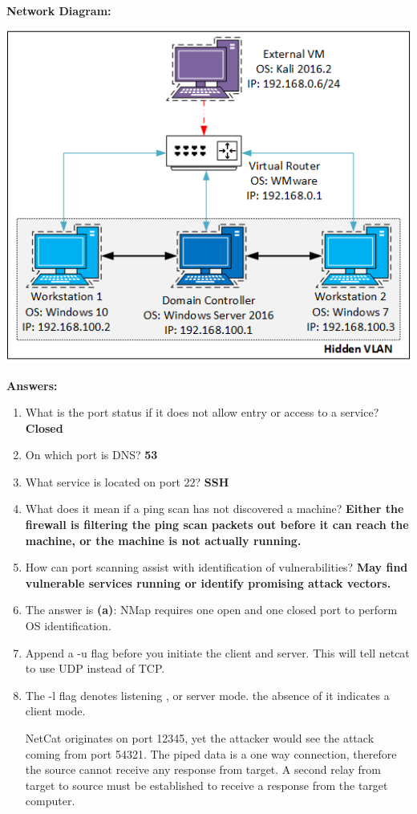 \documentclass[12pt]{article}
\begin{document}
\textbf{Network Diagram:}

\begin{center}
	\includegraphics{NetworkDiagram.png}
\end{center}


\newpage
\noindent
\textbf{Answers:}
\begin{enumerate}
\item What is the port status if it does not allow entry or access to a service? \textbf{Closed}
\item On which port is DNS? \textbf{53}
\item What service is located on port 22? \textbf{SSH}
\item What does it mean if a ping scan has not discovered a machine? \textbf{Either the firewall is filtering the ping scan packets out before it can reach the machine, or the machine is not actually running.}
\item How can port scanning assist with identification of vulnerabilities? \textbf{May find vulnerable services running or identify promising attack vectors.}
\item The answer is \textbf{(a)}:  NMap requires one open and one closed port to perform OS identification.
   
      \item Append a -u flag before you initiate the client and server. This will tell netcat to use UDP instead of TCP.
      \item  The -l flag denotes listening , or server mode. the absence of it indicates a client mode.

NetCat originates on port 12345, yet the attacker would see the attack coming from port 54321. The piped data is a one way connection, therefore the source cannot receive any response from target. A second relay from target to source must be established to receive a response from the target computer.\end{enumerate}
\end{document}
